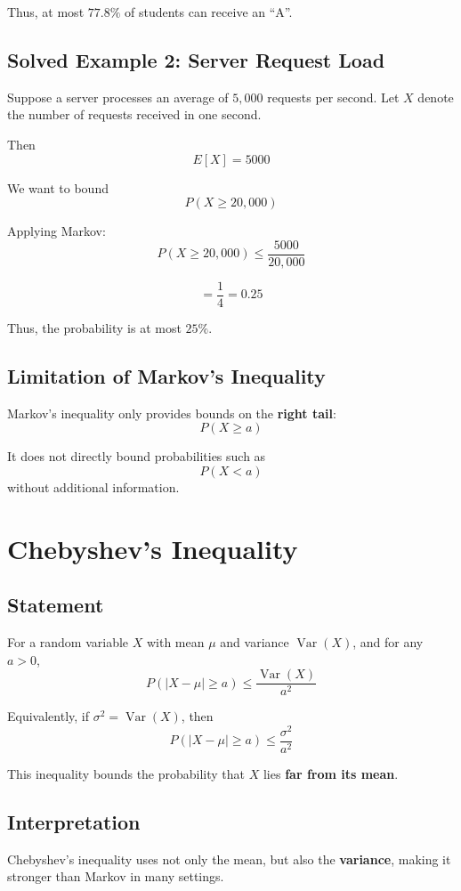 \documentclass[12pt]{article}
\begin{document}
Thus, at most \(77.8\%\) of students can receive an ``A''.

\subsection{Solved Example 2: Server Request Load}
Suppose a server processes an average of \(5{,}000\) requests per second. Let \(X\) denote the number of requests received in one second.

Then
\[
E[X]=5000
\]

We want to bound
\[
P(X \ge 20{,}000)
\]

Applying Markov:
\[
P(X \ge 20{,}000)\le \frac{5000}{20{,}000}
\]

\[
=\frac14=0.25
\]

Thus, the probability is at most \(25\%\).

\subsection{Limitation of Markov's Inequality}
Markov’s inequality only provides bounds on the \textbf{right tail}:
\[
P(X \ge a)
\]

It does not directly bound probabilities such as
\[
P(X<a)
\]
without additional information.

\section{Chebyshev's Inequality}

\subsection{Statement}
For a random variable \(X\) with mean \(\mu\) and variance \(\operatorname{Var}(X)\), and for any \(a>0\),
\[
P(|X-\mu|\ge a)\le \frac{\operatorname{Var}(X)}{a^2}
\]

Equivalently, if \(\sigma^2 = \operatorname{Var}(X)\), then
\[
P(|X-\mu|\ge a)\le \frac{\sigma^2}{a^2}
\]

This inequality bounds the probability that \(X\) lies \textbf{far from its mean}.

\subsection{Interpretation}
Chebyshev’s inequality uses not only the mean, but also the \textbf{variance}, making it stronger than Markov in many settings.
\end{document}
